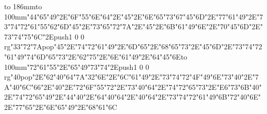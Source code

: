 \hbox to 186mm{\hsize=81mm\vbox to 100mm{\vfill\ipa\char"44\ipa\char"65\ipa\char"49\ipa\char"2E\ipa\char"6F\ipa\char"55\ipa\char"6E\ipa\char"64\ipa\char"2E\ipa\char"45\ipa\char"2E\ipa\char"6E\ipa\char"65\ipa\char"73\medskip\ipa\char"67\ipa\char"45\ipa\char"6D\ipa\char"2E\ipa\char"77\ipa\char"61\ipa\char"49\ipa\char"2E\ipa\char"73\ipa\char"74\ipa\char"72\ipa\char"61\ipa\char"55\ipa\char"62\medskip\ipa\char"6D\ipa\char"45\ipa\char"2E\ipa\char"73\ipa\char"65\ipa\char"72\ipa\char"7A\ipa\char"2E\ipa\char"45\ipa\char"2E\ipa\char"6B\ipa\char"61\ipa\char"49\ipa\char"6E\ipa\char"2E\ipa\char"70\ipa\char"45\ipa\char"6D\ipa\char"2E\ipa\char"73\ipa\char"74\ipa\char"75\ipa\char"6C\ipa\char"2E\pdfcolorstack\match push{1 0 0 rg}\ipa\char"33\ipa\char"72\ipa\char"7A\pdfcolorstack\match pop{}\medskip\ipa\char"45\ipa\char"2E\ipa\char"74\ipa\char"72\ipa\char"61\ipa\char"49\ipa\char"2E\ipa\char"6D\ipa\char"65\ipa\char"2E\ipa\char"68\ipa\char"65\ipa\char"73\ipa\char"2E\ipa\char"45\ipa\char"6D\ipa\char"2E\ipa\char"73\ipa\char"74\ipa\char"72\ipa\char"61\ipa\char"49\ipa\char"74\medskip\ipa\char"6D\ipa\char"65\ipa\char"73\ipa\char"2E\ipa\char"62\ipa\char"75\ipa\char"2E\ipa\char"6E\ipa\char"61\ipa\char"49\ipa\char"2E\ipa\char"64\ipa\char"45\ipa\char"6E\vfill}\hfill\vbox to 100mm{\vfill\ipa\char"72\ipa\char"61\ipa\char"55\ipa\char"2E\ipa\char"65\ipa\char"49\ipa\char"73\ipa\char"74\ipa\char"2E\pdfcolorstack\match push{1 0 0 rg}\ipa\char"40\pdfcolorstack\match pop{}\ipa\char"2E\ipa\char"62\ipa\char"40\ipa\char"64\medskip\ipa\char"7A\ipa\char"32\ipa\char"6E\ipa\char"2E\ipa\char"6C\ipa\char"61\ipa\char"49\ipa\char"2E\ipa\char"73\ipa\char"74\ipa\char"72\ipa\char"4F\ipa\char"49\ipa\char"6E\medskip\ipa\char"73\ipa\char"40\ipa\char"2E\ipa\char"7A\ipa\char"40\ipa\char"6C\ipa\char"66\ipa\char"2E\ipa\char"40\ipa\char"2E\ipa\char"72\ipa\char"6F\ipa\char"55\ipa\char"72\ipa\char"2E\ipa\char"73\ipa\char"40\ipa\char"64\ipa\char"2E\ipa\char"74\ipa\char"72\ipa\char"65\ipa\char"73\ipa\char"2E\ipa\char"E6\ipa\char"73\ipa\char"6B\medskip\ipa\char"40\ipa\char"2E\ipa\char"74\ipa\char"72\ipa\char"65\ipa\char"49\ipa\char"2E\ipa\char"44\ipa\char"40\ipa\char"2E\ipa\char"64\ipa\char"40\ipa\char"64\ipa\char"2E\ipa\char"40\ipa\char"64\ipa\char"2E\ipa\char"73\ipa\char"74\ipa\char"72\ipa\char"61\ipa\char"49\ipa\char"6B\medskip\ipa\char"72\ipa\char"40\ipa\char"6E\ipa\char"2E\ipa\char"77\ipa\char"65\ipa\char"2E\ipa\char"6E\ipa\char"65\ipa\char"49\ipa\char"2E\ipa\char"68\ipa\char"61\ipa\char"6C\vfill}}\eject
